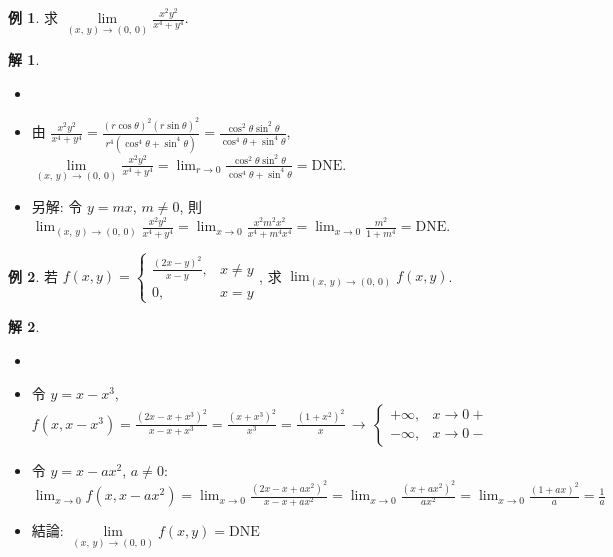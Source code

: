 \documentclass[12pt]{extarticle}
\newcommand{\ds}{\displaystyle}
\theoremstyle{definition}
\newtheorem*{ex}{例}
\newtheorem*{sol}{解}
\begin{document}
\begin{ex}
  求 $\ds\lim\limits_{(x,\,y)\to (0,\,0)}\frac{x^2y^2}{x^4 + y^4}$. 
\end{ex}
\begin{sol}
  \begin{itemize}\setlength{\itemsep}{0pt}
    \item[]
    \item 由 $\ds\frac{x^2y^2}{x^4 + y^4} = \frac{(r\cos\theta)^2(r\sin\theta)^2}{r^4(\cos^4\theta + \sin^4\theta)} = \frac{\cos^2\theta\sin^2\theta}{\cos^4\theta + \sin^4\theta}$, $\ds\lim\limits_{(x,\,y)\to (0,\,0)}\frac{x^2y^2}{x^4 + y^4} = \lim_{r\to 0}\frac{\cos^2\theta\sin^2\theta}{\cos^4\theta + \sin^4\theta} = \text{DNE}$. 
    \item 另解: 令 $y = mx$, $m\ne 0$, 則 $\ds\lim_{(x,\,y)\to (0,\,0)}\frac{x^2y^2}{x^4 + y^4} = \lim_{x\to 0}\frac{x^2m^2x^2}{x^4 + m^4 x^4} = \lim_{x\to 0}\frac{m^2}{1 + m^4} = \text{DNE}$. 
  \end{itemize}
\end{sol}

\begin{ex}
  若 $\ds f(x,y) = \begin{cases}\frac{(2x-y)^2}{x-y}, & x\ne y\\0, & x = y\end{cases}$, 求 $\ds\lim_{(x,\,y)\to (0,\,0)} f(x,y)$. 
\end{ex}
\begin{sol}
  \begin{itemize}\setlength{\itemsep}{0pt}
    \item[]
    \item 令 $y = x - x^3$, $\ds f(x,x - x^3) = \frac{{(2 x - x + x^3)}^2}{x - x + x^3} = \frac{{(x + x^3)}^2}{x^3} = \frac{{(1 + x^2)}^2}{x}\,\longrightarrow\,\begin{cases}+\infty, & x\to 0+\\-\infty, & x\to 0-\end{cases}$
    \item 令 $y = x - ax^2$, $a\ne 0$: $\ds\lim_{x\to 0}f(x,x - a x^2) = \lim_{x\to 0}\frac{{(2x - x + a x^2)}^2}{x - x + a x^2} = \lim_{x\to 0}\frac{{(x + a x^2)}^2}{a x^2} = \lim_{x\to 0}\frac{{(1 + a x)}^2}{a} = \frac{1}{a}$
    \item 結論: $\ds\lim\limits_{(x,\,y)\to(0,\,0)}f(x,y) = \text{DNE}$
  \end{itemize}
\end{sol}
\end{document}
